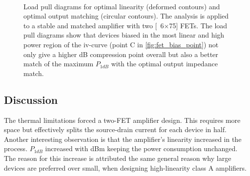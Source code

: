 				\begin{figure}[h!]
					\centering
					 \\
					\caption[Load pull diagrams for IF amplifier 2.]{Load pull diagrams for optimal linearity (deformed contours) and optimal output matching (circular contours). The analysis is applied to a stable and matched amplifier with two \unit[6$\times$75]{\mum} FETs. The load pull diagrams show that devices biased in the most linear and high power region of the iv-curve (point C in \autoref{fig:fet_bias_point}) not only give a higher \unit[1]{dB} compression point overall but also a better match of the maximum $P_{1dB}$ with the optimal output impedance match.}\label{fig:if2lp}
				\end{figure}

		\subsection{Discussion}
			The thermal limitations forced a two-FET amplifier design. This requires more space but effectively splits the source-drain current for each device in half. Another interesting observation is that the amplifier's linearity increased in the process. $P_{1dB}$ increased with \unit[4]{dBm} keeping the power consumption unchanged. The reason for this increase is attributed the same general reason why large devices are preferred over small, when designing high-linearity class A amplifiers.

